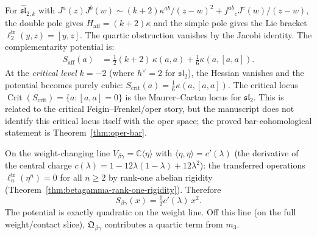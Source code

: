 \begin{example}
\label{ex:complementarity-potential-affine}
For $\widehat{\mathfrak{sl}}_{2,k}$ with
$J^a(z)J^b(w) \sim (k{+}2)\kappa^{ab}/(z{-}w)^2
+ f^{ab}{}_c J^c(w)/(z{-}w)$,
the double pole gives $H_{\mathrm{aff}} = (k{+}2)\kappa$
and the simple pole gives the Lie bracket
$\ell_2^{\mathrm{tr}}(y,z) = [y,z]$.
The quartic obstruction vanishes by the Jacobi identity.
The complementarity potential is:
\begin{align}
S_{\mathrm{aff}}(a)
&= \tfrac12(k{+}2)\,\kappa(a,a)
+ \tfrac16\kappa(a,[a,a]).
\label{eq:complementarity-potential-affine}
\end{align}
At the \emph{critical level} $k = -2$ (where $h^\vee = 2$ for
$\mathfrak{sl}_2$), the Hessian vanishes and the potential
becomes purely cubic:
$S_{\mathrm{crit}}(a) = \tfrac16\kappa(a,[a,a])$.
The critical locus
$\operatorname{Crit}(S_{\mathrm{crit}}) = \{a : [a,a]=0\}$
is the Maurer--Cartan locus for $\mathfrak{sl}_2$. This is related to
the critical Feigin--Frenkel/oper story, but the manuscript does not
identify this critical locus itself with the oper space; the proved
bar-cohomological statement is Theorem~\ref{thm:oper-bar}.
\end{example}

\begin{example}
\label{ex:complementarity-potential-betagamma}
On the weight-changing line $V_{\beta\gamma} = \mathbb{C}\langle\eta
\rangle$ with $\langle\eta,\eta\rangle = c'(\lambda)$
(the derivative of the central charge $c(\lambda)
= 1 - 12\lambda(1{-}\lambda) + 12\lambda^2$):
the transferred operations $\ell_n^{\mathrm{tr}}(\eta^n) = 0$ for
all $n \geq 2$ by rank-one abelian rigidity
(Theorem~\ref{thm:betagamma-rank-one-rigidity}). Therefore
\[
S_{\beta\gamma}(x) = \tfrac12 c'(\lambda)\,x^2.
\]
The potential is exactly quadratic on the weight line. Off this
line (on the full weight/contact slice), $\mathfrak{Q}_{\beta\gamma}$
contributes a quartic term from $m_3$.
\end{example}

